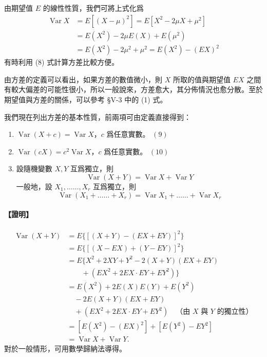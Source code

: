 由期望值 $E$ 的線性性質，我們可將上式化爲
\begin{align}
\operatorname{Var} X &= E[(X-\mu)^2] = E[X^2 - 2\mu X + \mu^2] \nonumber \\
&= E(X^2) - 2\mu E(X) + E(\mu^2) \nonumber \\
&= E(X^2) - 2\mu^2 + \mu^2 = E(X^2) - (EX)^2 \tag{8}\label{eq:b5s-5-2-8}
\end{align}
有時利用 (8) 式計算方差比較方便。

由方差的定義可以看出，如果方差的數值微小，則 $X$ 所取的值與期望值 $EX$ 之間有較大偏差的可能性很小，所以一般說來，方差愈大，其分佈情況也愈分散。至於期望值與方差的關係，可以參考 §V-3 中的 (1) 式。

我們現在列出方差的基本性質，前兩項可由定義直接得到：
\begin{enumerate}[label=\arabic*., leftmargin=2em, itemsep=0.3em]
  \item $\operatorname{Var}(X+c) = \operatorname{Var} X$，$c$ 爲任意實數。 \hfill $(9)$\label{eq:b5s-5-2-9}
  \item $\operatorname{Var}(cX) = c^2 \operatorname{Var} X$，$c$ 爲任意實數。 \hfill $(10)$\label{eq:b5s-5-2-10}
  \item 設隨機變數 $X, Y$ 互爲獨立，則
  \begin{equation}\tag{11}\label{eq:b5s-5-2-11}
  \operatorname{Var}(X+Y) = \operatorname{Var} X + \operatorname{Var} Y
  \end{equation}
  一般地，設 $X_1, \ldots\ldots, X_r$ 互爲獨立，則
  \begin{equation}\tag{12}\label{eq:b5s-5-2-12}
  \operatorname{Var}(X_1 + \ldots\ldots + X_r) = \operatorname{Var} X_1 + \ldots\ldots + \operatorname{Var} X_r
  \end{equation}
\end{enumerate}

\medskip
\paragraph{【證明】}
\begin{align*}
\operatorname{Var}(X+Y) &= E\{[(X+Y)-(EX+EY)]^2\} \\
&= E\{[(X-EX)+(Y-EY)]^2\} \\
&= E\{X^2 + 2XY + Y^2 - 2(X+Y)(EX+EY) \\
&\qquad + (EX^2 + 2EX \cdot EY + EY^2)\} \\
&= E(X^2) + 2E(X)E(Y) + E(Y^2) \\
&\quad - 2E(X+Y)(EX+EY) \\
&\quad + (EX^2 + 2EX \cdot EY + EY^2) \quad \text{（由 $X$ 與 $Y$ 的獨立性）} \\
&= [E(X^2) - (EX)^2] + [E(Y^2) - EY^2] \\
&= \operatorname{Var} X + \operatorname{Var} Y.
\end{align*}
對於一般情形，可用數學歸納法導得。

